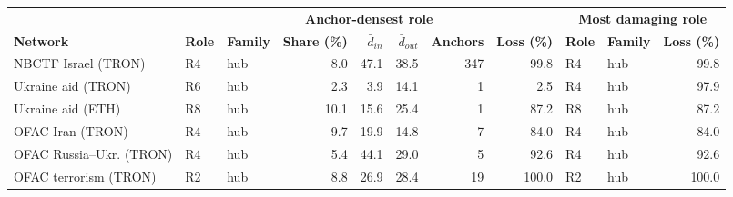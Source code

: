 \begin{tabular}{lllrrrrrllr}
\toprule
 & \multicolumn{7}{c}{\textbf{Anchor-densest role}} & \multicolumn{3}{c}{\textbf{Most damaging role}} \\
\cmidrule(lr){2-8}\cmidrule(lr){9-11}
\textbf{Network} & \textbf{Role} & \textbf{Family} & \textbf{Share (\%)} & $\bar{d}_{in}$ & $\bar{d}_{out}$ & \textbf{Anchors} & \textbf{Loss (\%)} & \textbf{Role} & \textbf{Family} & \textbf{Loss (\%)} \\
\midrule
NBCTF Israel (TRON) & R4 & hub & 8.0 & 47.1 & 38.5 & 347 & 99.8 & R4 & hub & 99.8 \\
Ukraine aid (TRON) & R6 & hub & 2.3 & 3.9 & 14.1 & 1 & 2.5 & R4 & hub & 97.9 \\
Ukraine aid (ETH) & R8 & hub & 10.1 & 15.6 & 25.4 & 1 & 87.2 & R8 & hub & 87.2 \\
OFAC Iran (TRON) & R4 & hub & 9.7 & 19.9 & 14.8 & 7 & 84.0 & R4 & hub & 84.0 \\
OFAC Russia--Ukr. (TRON) & R4 & hub & 5.4 & 44.1 & 29.0 & 5 & 92.6 & R4 & hub & 92.6 \\
OFAC terrorism (TRON) & R2 & hub & 8.8 & 26.9 & 28.4 & 19 & 100.0 & R2 & hub & 100.0 \\
\bottomrule
\end{tabular}
